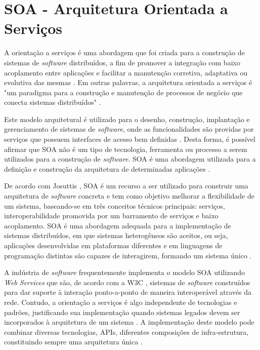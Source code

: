 \section{SOA - Arquitetura Orientada a Serviços}
A orientação a serviços é uma abordagem que foi criada para a construção de sistemas de \textit{software} distribuídos, a fim de promover a integração com baixo acoplamento entre aplicações e facilitar a manutenção corretiva, adaptativa ou evolutiva das mesmas \cite{linthicum_soainrealworld_2007}. Em outras palavras, a arquitetura orientada a serviços é "um paradigma para a construção e manutenção de processos de negócio que conecta sistemas distribuídos" \cite{josuttis_soa_2007}.

Este modelo arquitetural é utilizado para o desenho, construção, implantação e gerenciamento de sistemas de \textit{software}, onde as funcionalidades são providas por serviços que possuem interfaces de acesso bem definidas \cite{lewis_getting_2010}. Desta forma, é possível afirmar que SOA não é um tipo de tecnologia, ferramenta ou processo a serem utilizados para a construção de \textit{software}. SOA é uma abordagem utilizada para a definição e construção da arquitetura de determinadas aplicações \cite{oliveira_interoperabilidade}.

De acordo com Josuttis \cite{josuttis_soa_2007}, SOA é um recurso a ser utilizado para construir uma arquitetura de \textit{software} concreta e tem como objetivo melhorar a flexibilidade de um sistema, baseando-se em três conceitos técnicos principais: serviços, interoperabilidade promovida por um barramento de serviços e baixo acoplamento. SOA é uma abordagem adequada para a implementação de sistemas distribuídos, em que sistemas heterogêneos são aceitos, ou seja, aplicações desenvolvidas em plataformas diferentes e em linguagens de programação distintas são capazes de interagirem, formando um sistema único \cite{josuttis_soa_2007}.

A indústria de \textit{software} frequentemente implementa o modelo SOA utilizando \textit{Web Services} que são, de acordo com a W3C \cite{haas_web_2004}, sistemas de \textit{software} construídos para dar suporte à interação ponto-a-ponto de maneira interoperável através da rede. Contudo, a orientação a serviços é algo independente de tecnologias e padrões, justificando sua implementação quando sistemas legados devem ser incorporados à arquitetura de um sistema \cite{linthicum_soainrealworld_2007}. A implementação deste modelo pode combinar diversas tecnologias, APIs, diferentes composições de infra-estrutura, constituindo sempre uma arquitetura única \cite{erl_orientacaoaservico_2009}.

